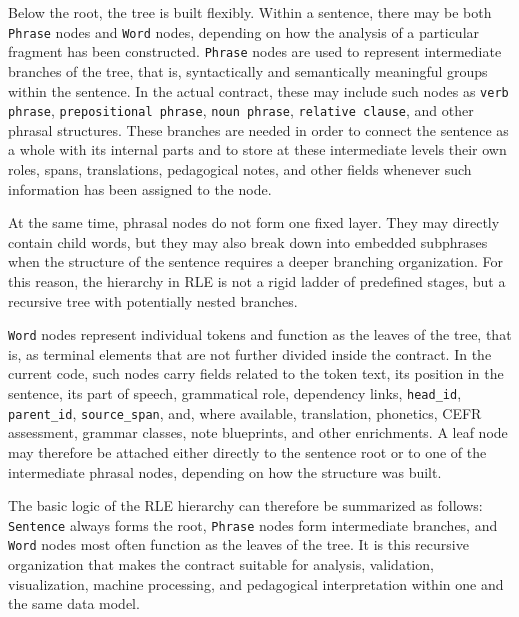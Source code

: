\documentclass[12pt,a4paper,oneside]{report}
\begin{document}
Below the root, the tree is built flexibly. Within a sentence, there may be both \texttt{Phrase} nodes and \texttt{Word} nodes, depending on how the analysis of a particular fragment has been constructed. \texttt{Phrase} nodes are used to represent intermediate branches of the tree, that is, syntactically and semantically meaningful groups within the sentence. In the actual contract, these may include such nodes as \texttt{verb phrase}, \texttt{prepositional phrase}, \texttt{noun phrase}, \texttt{relative clause}, and other phrasal structures. These branches are needed in order to connect the sentence as a whole with its internal parts and to store at these intermediate levels their own roles, spans, translations, pedagogical notes, and other fields whenever such information has been assigned to the node.

At the same time, phrasal nodes do not form one fixed layer. They may directly contain child words, but they may also break down into embedded subphrases when the structure of the sentence requires a deeper branching organization. For this reason, the hierarchy in RLE is not a rigid ladder of predefined stages, but a recursive tree with potentially nested branches.

\texttt{Word} nodes represent individual tokens and function as the leaves of the tree, that is, as terminal elements that are not further divided inside the contract. In the current code, such nodes carry fields related to the token text, its position in the sentence, its part of speech, grammatical role, dependency links, \texttt{head\_id}, \texttt{parent\_id}, \texttt{source\_span}, and, where available, translation, phonetics, CEFR assessment, grammar classes, note blueprints, and other enrichments. A leaf node may therefore be attached either directly to the sentence root or to one of the intermediate phrasal nodes, depending on how the structure was built.

The basic logic of the RLE hierarchy can therefore be summarized as follows: \texttt{Sentence} always forms the root, \texttt{Phrase} nodes form intermediate branches, and \texttt{Word} nodes most often function as the leaves of the tree. It is this recursive organization that makes the contract suitable for analysis, validation, visualization, machine processing, and pedagogical interpretation within one and the same data model.
\end{document}
